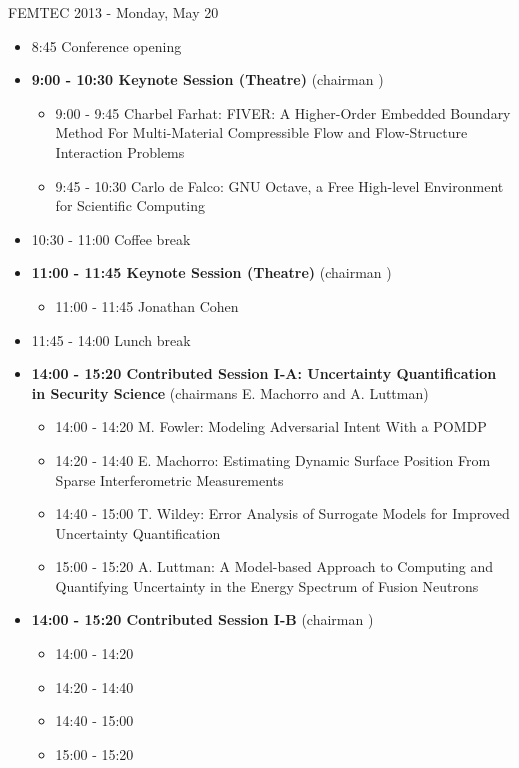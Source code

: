 \documentclass[10pt, A4]{article}%
\begin{document}
\centerline{\huge FEMTEC 2013 - Monday, May 20}
\vspace{4mm}

\begin{itemize}    
  \item 8:45 Conference opening
  \item {\bf 9:00 - 10:30 Keynote Session (Theatre)} (chairman ) 
  \begin{itemize}
    \item 9:00 - 9:45 {Charbel Farhat}: {FIVER: A Higher-Order Embedded Boundary Method For Multi-Material Compressible Flow and Flow-Structure Interaction Problems}
    \item 9:45 - 10:30 {Carlo de Falco}: {GNU Octave, a Free High-level Environment for Scientific Computing}
  \end{itemize}
  \item 10:30 - 11:00 Coffee break
  \item {\bf 11:00 - 11:45 Keynote Session (Theatre)} (chairman ) 
  \begin{itemize}
    \item 11:00 - 11:45 {Jonathan Cohen}
  \end{itemize}
  \item 11:45 - 14:00 Lunch break      
  \item {\bf 14:00 - 15:20 Contributed Session I-A: Uncertainty Quantification in Security Science} (chairmans E. Machorro and A. Luttman) 
  \begin{itemize}
    \item 14:00 - 14:20 {M. Fowler}: {Modeling Adversarial Intent With a POMDP}
    \item 14:20 - 14:40 {E. Machorro}: {Estimating Dynamic Surface Position From Sparse Interferometric Measurements}
    \item 14:40 - 15:00 {T. Wildey}: {Error Analysis of Surrogate Models for Improved Uncertainty Quantification}
    \item 15:00 - 15:20 {A. Luttman}: {A Model-based Approach to Computing and Quantifying Uncertainty in the Energy Spectrum of Fusion Neutrons}
  \end{itemize}
  \item {\bf 14:00 - 15:20 Contributed Session I-B} (chairman ) 
  \begin{itemize}
    \item 14:00 - 14:20 
    \item 14:20 - 14:40 
    \item 14:40 - 15:00 
    \item 15:00 - 15:20 

\end{itemize}
\end{itemize}
\end{document}
